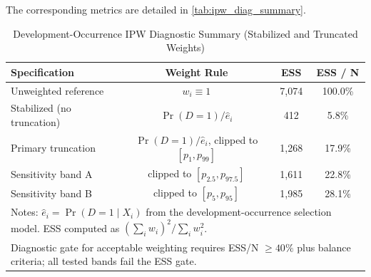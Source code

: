 

The corresponding metrics are detailed in \autoref{tab:ipw_diag_summary}.

\begin{table}[H]
\centering
\caption{Development-Occurrence IPW Diagnostic Summary (Stabilized and Truncated Weights)}
\label{tab:ipw_diag_summary}
\begin{tabular}{lccc}
\toprule
\textbf{Specification} & \textbf{Weight Rule} & \textbf{ESS} & \textbf{ESS / N} \\
\midrule
Unweighted reference & $w_i \equiv 1$ & 7,074 & 100.0\% \\
Stabilized (no truncation) & $\Pr(D=1)/\hat e_i$ & 412 & 5.8\% \\
Primary truncation & $\Pr(D=1)/\hat e_i$, clipped to $[p_{1},p_{99}]$ & 1,268 & 17.9\% \\
Sensitivity band A & clipped to $[p_{2.5},p_{97.5}]$ & 1,611 & 22.8\% \\
Sensitivity band B & clipped to $[p_{5},p_{95}]$ & 1,985 & 28.1\% \\
\bottomrule
\multicolumn{4}{l}{\footnotesize Notes: $\hat e_i = \Pr(D=1\mid X_i)$ from the development-occurrence selection model. ESS computed as $ (\sum_i w_i)^2 / \sum_i w_i^2 $.} \\
\multicolumn{4}{l}{\footnotesize Diagnostic gate for acceptable weighting requires ESS/N $\ge 40\%$ plus balance criteria; all tested bands fail the ESS gate.} \\
\end{tabular}
\end{table}
